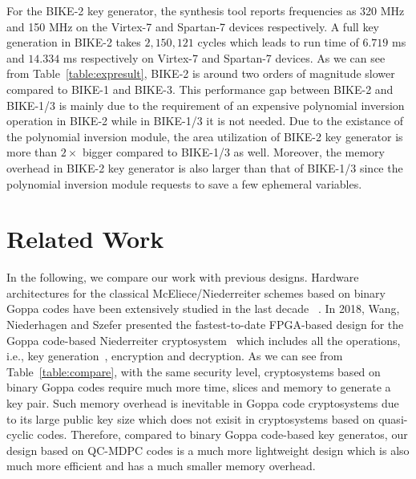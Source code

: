 \documentclass[runningheads]{llncs}
\begin{document}
For the BIKE-2 key generator, the synthesis tool reports
frequencies as 320 MHz and 150 MHz on the Virtex-7 and Spartan-7 devices respectively.
A full key generation in BIKE-2 takes $2,150,121$ cycles
which leads to run time of $6.719$ ms and $14.334$ ms respectively
on Virtex-7 and Spartan-7 devices.
As we can see from Table~\ref{table:expresult},
BIKE-2 is around two orders of magnitude slower compared to BIKE-1 and BIKE-3.
This performance gap between BIKE-2 and BIKE-1/3 is mainly
due to the requirement of an expensive polynomial inversion operation in BIKE-2
while in BIKE-1/3 it is not needed.
Due to the existance of the polynomial inversion module,
the area utilization of BIKE-2 key generator is more than $2\times$
bigger compared to BIKE-1/3 as well.
Moreover, the memory overhead in BIKE-2 key generator
is also larger than that of BIKE-1/3 since
the polynomial inversion module
requests to save a few ephemeral variables.

\section{Related Work}
In the following, we compare our work with previous designs.
Hardware architectures for the classical McEliece/Niederreiter
schemes based on binary Goppa
codes have been extensively studied in the last decade
~\cite{eisenbarth2009microeliece,shoufan2010novel,ghosh2012speed,heyse2012towards,wang2017fpga,wang2018fpga}.
In 2018, Wang, Niederhagen and Szefer presented
the fastest-to-date FPGA-based design for the
Goppa code-based Niederreiter cryptosystem~\cite{wang2018fpga}
which includes all the operations, i.e.,
key generation~\cite{wang2017fpga}, encryption and decryption.
As we can see from Table~\ref{table:compare}, with the same security level,
cryptosystems based on binary Goppa codes
require much more time, slices and memory to generate
a key pair.
Such memory overhead is inevitable in Goppa code
cryptosystems due to its large public key size
which does not exisit in cryptosystems based on
quasi-cyclic codes.
Therefore, compared to binary Goppa code-based key generatos,
our design based on QC-MDPC codes is a much more lightweight
design which is also much more efficient and has a
much smaller memory overhead.
\end{document}
